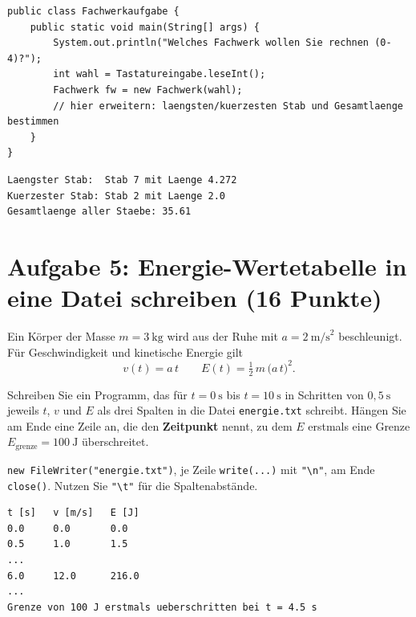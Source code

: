 \documentclass[
	fontsize=12pt,
	paper=a4,
	numbers=noenddot,
	parskip=half,
	openany
]{scrbook}
\begin{document}
\begin{lstlisting}
public class Fachwerkaufgabe {
    public static void main(String[] args) {
        System.out.println("Welches Fachwerk wollen Sie rechnen (0-4)?");
        int wahl = Tastatureingabe.leseInt();
        Fachwerk fw = new Fachwerk(wahl);
        // hier erweitern: laengsten/kuerzesten Stab und Gesamtlaenge bestimmen
    }
}
\end{lstlisting}

\begin{beispiel}
\begin{lstlisting}[language={}]
Laengster Stab:  Stab 7 mit Laenge 4.272
Kuerzester Stab: Stab 2 mit Laenge 2.0
Gesamtlaenge aller Staebe: 35.61
\end{lstlisting}
\end{beispiel}

\clearpage
\section*{Aufgabe 5: Energie-Wertetabelle in eine Datei schreiben \hfill (16 Punkte)}

Ein Körper der Masse $m = 3~\text{kg}$ wird aus der Ruhe mit $a = 2~\text{m/s}^2$ beschleunigt.
Für Geschwindigkeit und kinetische Energie gilt
\[ v(t) = a\,t \qquad E(t) = \tfrac{1}{2}\,m\,\bigl(a\,t\bigr)^2. \]

Schreiben Sie ein Programm, das für $t = 0~\text{s}$ bis $t = 10~\text{s}$ in Schritten von $0{,}5~\text{s}$ jeweils $t$, $v$ und $E$ als drei Spalten in die Datei \texttt{energie.txt} schreibt. Hängen Sie am Ende eine Zeile an, die den \textbf{Zeitpunkt} nennt, zu dem $E$ erstmals eine Grenze $E_{\text{grenze}} = 100~\text{J}$ überschreitet.

\begin{hinweis}[FileWriter]
	\lstinline|new FileWriter("energie.txt")|, je Zeile \texttt{write(...)} mit \lstinline|"\n"|, am Ende \texttt{close()}.
	Nutzen Sie \lstinline|"\t"| für die Spaltenabstände.
\end{hinweis}

\begin{beispiel}
\begin{lstlisting}[language={}]
t [s]   v [m/s]   E [J]
0.0     0.0       0.0
0.5     1.0       1.5
...
6.0     12.0      216.0
...
Grenze von 100 J erstmals ueberschritten bei t = 4.5 s
\end{lstlisting}
\end{beispiel}
\end{document}
